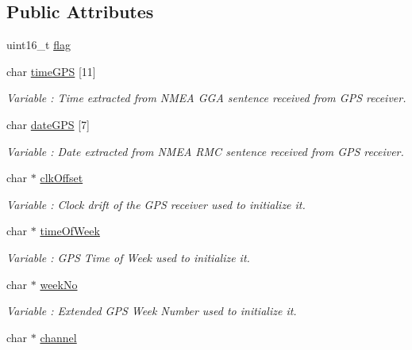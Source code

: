 \subsection*{Public Attributes}
\begin{DoxyCompactItemize}
\item 
uint16\+\_\+t \hyperlink{class_wasp_g_p_s_a626c22eceec7e3c24c617deb83b4ec88}{flag}
\item 
char \hyperlink{class_wasp_g_p_s_a168dcfbebb54ee62c3cc02c2d84930f3}{time\+G\+PS} \mbox{[}11\mbox{]}
\begin{DoxyCompactList}\small\item\em Variable \+: Time extracted from N\+M\+EA G\+GA sentence received from G\+PS receiver. \end{DoxyCompactList}\item 
char \hyperlink{class_wasp_g_p_s_a559035395a1af4c42e3b8ec4f8fc9650}{date\+G\+PS} \mbox{[}7\mbox{]}
\begin{DoxyCompactList}\small\item\em Variable \+: Date extracted from N\+M\+EA R\+MC sentence received from G\+PS receiver. \end{DoxyCompactList}\item 
char $\ast$ \hyperlink{class_wasp_g_p_s_a41e3f22ac06b05cdf5a53bd7aba6131e}{clk\+Offset}
\begin{DoxyCompactList}\small\item\em Variable \+: Clock drift of the G\+PS receiver used to initialize it. \end{DoxyCompactList}\item 
char $\ast$ \hyperlink{class_wasp_g_p_s_a55ac56acd96b1395b64abe8aa561ddcd}{time\+Of\+Week}
\begin{DoxyCompactList}\small\item\em Variable \+: G\+PS Time of Week used to initialize it. \end{DoxyCompactList}\item 
char $\ast$ \hyperlink{class_wasp_g_p_s_a81ffa14a72dd68d969eaf0d6fb4200d9}{week\+No}\hypertarget{class_wasp_g_p_s_a81ffa14a72dd68d969eaf0d6fb4200d9}{}\label{class_wasp_g_p_s_a81ffa14a72dd68d969eaf0d6fb4200d9}

\begin{DoxyCompactList}\small\item\em Variable \+: Extended G\+PS Week Number used to initialize it. \end{DoxyCompactList}\item 
char $\ast$ \hyperlink{class_wasp_g_p_s_acf2fad0a21eab1fbbaf679b089ade066}{channel}\hypertarget{class_wasp_g_p_s_acf2fad0a21eab1fbbaf679b089ade066}{}\label{class_wasp_g_p_s_acf2fad0a21eab1fbbaf679b089ade066}


\end{DoxyCompactItemize}
